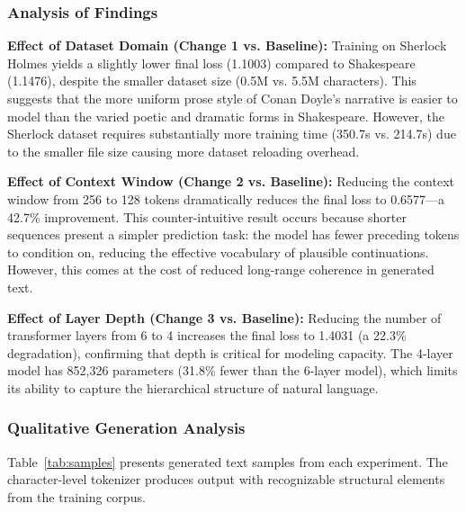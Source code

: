 \documentclass[conference]{IEEEtran}
\begin{document}
\subsubsection{Analysis of Findings}

\textbf{Effect of Dataset Domain (Change 1 vs. Baseline):} Training on Sherlock Holmes yields a slightly lower final loss (1.1003) compared to Shakespeare (1.1476), despite the smaller dataset size (0.5M vs. 5.5M characters). This suggests that the more uniform prose style of Conan Doyle's narrative is easier to model than the varied poetic and dramatic forms in Shakespeare. However, the Sherlock dataset requires substantially more training time (350.7s vs. 214.7s) due to the smaller file size causing more dataset reloading overhead.

\textbf{Effect of Context Window (Change 2 vs. Baseline):} Reducing the context window from 256 to 128 tokens dramatically reduces the final loss to 0.6577---a 42.7\% improvement. This counter-intuitive result occurs because shorter sequences present a simpler prediction task: the model has fewer preceding tokens to condition on, reducing the effective vocabulary of plausible continuations. However, this comes at the cost of reduced long-range coherence in generated text.

\textbf{Effect of Layer Depth (Change 3 vs. Baseline):} Reducing the number of transformer layers from 6 to 4 increases the final loss to 1.4031 (a 22.3\% degradation), confirming that depth is critical for modeling capacity. The 4-layer model has 852,326 parameters (31.8\% fewer than the 6-layer model), which limits its ability to capture the hierarchical structure of natural language.

\subsubsection{Qualitative Generation Analysis}

Table~\ref{tab:samples} presents generated text samples from each experiment. The character-level tokenizer produces output with recognizable structural elements from the training corpus.
\end{document}
